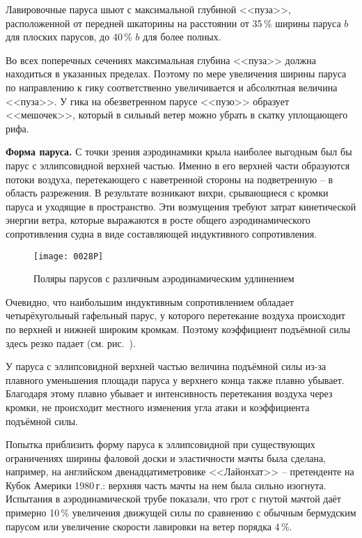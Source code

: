 Лавировочные паруса шьют с максимальной глубиной <<пуза>>,
расположенной от передней шкаторины на расстоянии от 35\,\%
ширины паруса $b$ для плоских парусов, до 40\,\% $b$ для более
полных.

Во всех поперечных сечениях максимальная глубина <<пуза>> должна
находиться в указанных пределах. Поэтому по мере увеличения ширины
паруса по направлению к гику соответственно увеличивается и абсолютная
величина <<пуза>>. У гика на обезветренном парусе <<пузо>> образует
<<мешочек>>, который в сильный ветер можно убрать в скатку уплощающего
рифа.

\textbf{Форма паруса.} С точки зрения аэродинамики
крыла наиболее выгодным был бы парус с эллипсовидной верхней
частью. Именно в его верхней части образуются потоки воздуха,
перетекающего с наветренной стороны на подветренную \--- в область
разрежения. В результате возникают вихри, срывающиеся с кромки паруса
и уходящие в пространство. Эти возмущения требуют затрат кинетической
энергии ветра, которые выражаются в росте общего аэродинамического
сопротивления судна в виде составляющей индуктивного сопротивления.

\begin{figure}[htb]
  \centering
  \texttt{[image: 0028P]}
  \caption{Поляры парусов с различным аэродинамическим удлинением}
  \label{fig:28}
\end{figure}

Очевидно, что наибольшим индуктивным сопротивлением обладает
четырёхугольный гафельный парус, у
которого перетекание воздуха происходит по верхней и нижней широким
кромкам. Поэтому коэффициент подъёмной силы здесь резко падает
(см. рис.~).

У паруса с эллипсовидной верхней частью величина подъёмной силы из-за
плавного уменьшения площади паруса у верхнего конца также плавно
убывает. Благодаря этому плавно убывает и интенсивность перетекания
воздуха через кромки, не происходит местного изменения угла атаки и
коэффициента подъёмной силы.

Попытка приблизить форму паруса к эллипсовидной при существующих
ограничениях ширины фаловой доски и эластичности мачты была сделана,
например, на английском двенадцатиметровике <<Лайонхат>> \---
претенденте на Кубок Америки 1980\,г.: верхняя часть мачты на нем была
сильно изогнута. Испытания в аэродинамической трубе показали, что грот
с гнутой мачтой даёт примерно 10\,\% увеличения движущей силы
по сравнению с обычным бермудским парусом или увеличение скорости
лавировки на ветер порядка 4\,\%.
 
